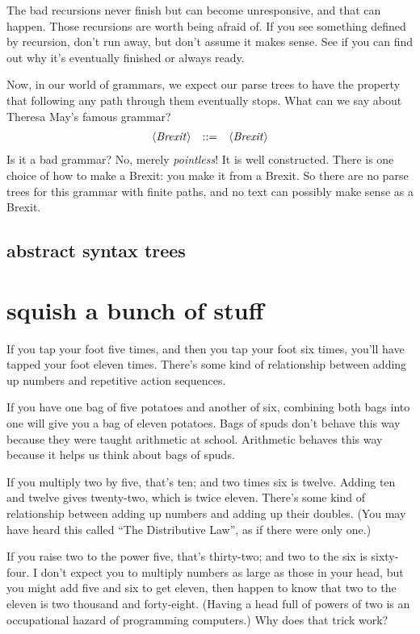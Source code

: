 \documentclass{book}
\begin{document}
The bad recursions never finish but can become unresponsive, and that can happen. Those recursions are worth being afraid of. If you see something defined by recursion, don't run away, but don't assume it makes sense. See if you can find out why it's eventually finished or always ready.

Now, in our world of grammars, we expect our parse trees to have the property that following any path through them eventually stops. What can we say about Theresa May's famous grammar?
\[\begin{array}{rrl}
\langle\mathit{Brexit}\rangle & ::= & \langle\mathit{Brexit}\rangle
\end{array}\]
Is it a bad grammar? No, merely \emph{pointless}! It is well constructed. There is one choice of how to make a Brexit: you make it from a Brexit. So there are no parse trees for this grammar with finite paths, and no text can possibly make sense as a Brexit.


\section{abstract syntax trees}


\chapter{squish a bunch of stuff}

If you tap your foot five times, and then you tap your foot six times, you'll have tapped your foot eleven times. There's some kind of relationship between adding up numbers and repetitive action sequences.

If you have one bag of five potatoes and another of six, combining both bags into one will give you a bag of eleven potatoes. Bags of spuds don't behave this way because they were taught arithmetic at school. Arithmetic behaves this way because it helps us think about bags of spuds.

If you multiply two by five, that's ten; and two times six is twelve. Adding ten and twelve gives twenty-two, which is twice eleven. There's some kind of relationship between adding up numbers and adding up their doubles. (You may have heard this called ``The Distributive Law'', as if there were only one.)

If you raise two to the power five, that's thirty-two; and two to the six is sixty-four. I don't expect you to multiply numbers as large as those in your head, but you might add five and six to get eleven, then happen to know that two to the eleven is two thousand and forty-eight. (Having a head full of powers of two is an occupational hazard of programming computers.) Why does that trick work?
\end{document}
